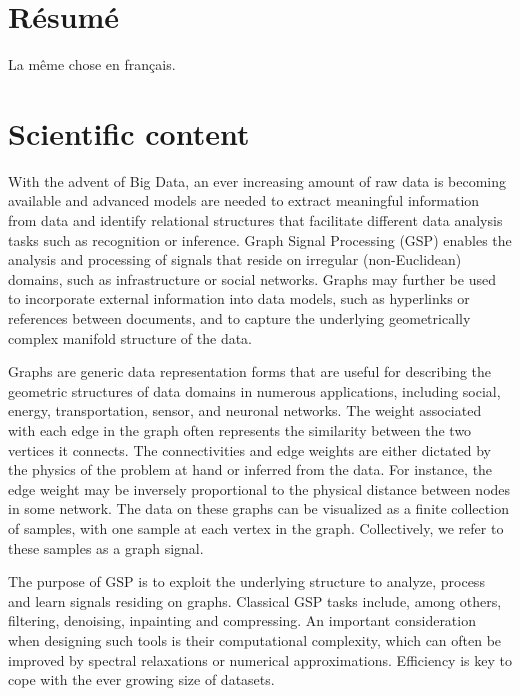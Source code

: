 \documentclass[a4paper]{scrartcl}
\begin{document}
\section{Résumé}

La même chose en français.


\section{Scientific content}

With the advent of Big Data, an ever increasing amount of raw data is becoming
available and advanced models are needed to extract meaningful information from
data and identify relational structures that facilitate different data analysis
tasks such as recognition or inference. Graph Signal Processing (GSP) enables
the analysis and processing of signals that reside on irregular (non-Euclidean)
domains, such as infrastructure or social networks. Graphs may further be used
to incorporate external information into data models, such as hyperlinks or
references between documents, and to capture the underlying geometrically
complex manifold structure of the data.

Graphs are generic data representation forms that are useful for describing the
geometric structures of data domains in numerous applications, including social,
energy, transportation, sensor, and neuronal networks.
The weight associated with each edge in the graph often represents the
similarity between the two vertices it connects. The connectivities and edge
weights are either dictated by the physics of the problem at hand or inferred
from the data. For instance, the edge weight may be inversely proportional to
the physical distance between nodes in some network.
The data on these graphs can be visualized as a finite collection of samples,
with one sample at each vertex in the graph. Collectively, we refer to these
samples as a graph signal. 

The purpose of GSP is to exploit the underlying structure to analyze, process
and learn signals residing on graphs. 
Classical GSP tasks include, among others, filtering, denoising, inpainting and
compressing. An important consideration when designing such tools is their
computational complexity, which can often be improved by spectral relaxations or
numerical approximations. Efficiency is key to cope with the ever growing size
of datasets.
\end{document}
